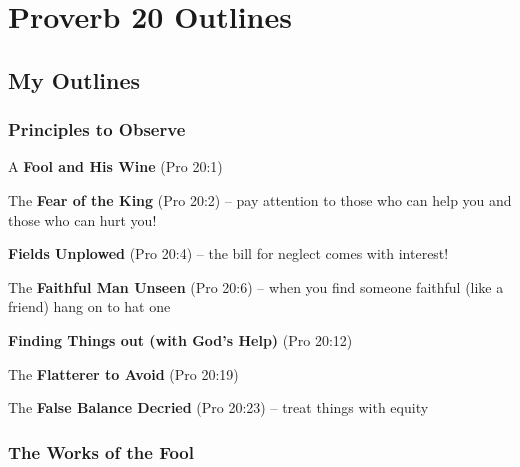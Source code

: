 \section{Proverb 20 Outlines}

\subsection{My Outlines}

\subsubsection{Principles to Observe}

\begin{compactenum}[I.]
    \item A \textbf{Fool and His Wine}  (Pro 20:1)
    \item The \textbf{Fear of the King}  (Pro 20:2) -- pay attention to those who can help you and those who can hurt you!
    \item \textbf{Fields Unplowed}  (Pro 20:4) -- the bill for neglect comes with interest!
    \item The \textbf{Faithful Man Unseen}  (Pro 20:6) -- when you find someone faithful (like a friend) hang on to hat one
    \item \textbf{Finding Things out (with God's Help)}  (Pro 20:12)
    \item The \textbf{Flatterer to Avoid}  (Pro 20:19)
    \item The \textbf{False Balance Decried}  (Pro 20:23) -- treat things with equity
\end{compactenum}


\subsubsection{The Works of the Fool}



